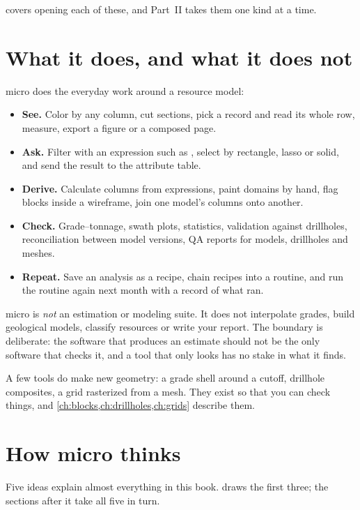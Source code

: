  covers opening each of these, and Part~II takes them one kind at a time.

\section{What it does, and what it does not}\label{sec:micro-scope}
micro does the everyday work around a resource model:

\begin{itemize}
\item \textbf{See.} Color by any column, cut sections, pick a record and read its whole row, measure, export a figure or a composed page.
\item \textbf{Ask.} Filter with an expression such as , select by rectangle, lasso or solid, and send the result to the attribute table.
\item \textbf{Derive.} Calculate columns from expressions, paint domains by hand, flag blocks inside a wireframe, join one model's columns onto another.
\item \textbf{Check.} Grade–tonnage, swath plots, statistics, validation against drillholes, reconciliation between model versions, QA reports for models, drillholes and meshes.
\item \textbf{Repeat.} Save an analysis as a recipe, chain recipes into a routine, and run the routine again next month with a record of what ran.
\end{itemize}

micro is \emph{not} an estimation or modeling suite. It does not interpolate grades, build geological models, classify resources or write your report. The boundary is deliberate: the software that produces an estimate should not be the only software that checks it, and a tool that only looks has no stake in what it finds.

\begin{note}
A few tools do make new geometry: a grade shell around a cutoff, drillhole composites, a grid rasterized from a mesh. They exist so that you can check things, and \cref{ch:blocks,ch:drillholes,ch:grids} describe them.
\end{note}

\section{How micro thinks}\label{sec:micro-model}
Five ideas explain almost everything in this book.  draws the first three; the sections after it take all five in turn.

